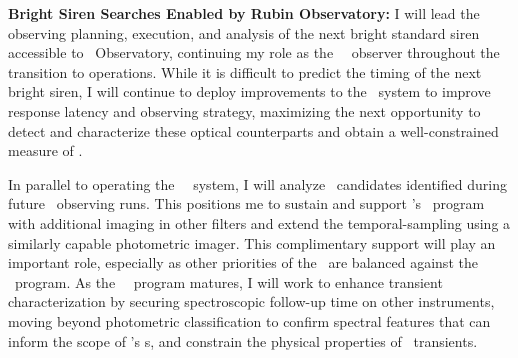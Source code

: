 \textbf{Bright Siren Searches Enabled by Rubin Observatory:}
I will lead the observing planning, execution, and analysis of the next bright standard siren accessible to \Rubin\ Observatory, 
continuing my role as the \Rubin\ \ToO\ observer throughout the transition to operations.
While it is difficult to predict the timing of the next bright siren, I will continue to deploy improvements to the \ToO\ system to improve response latency and observing strategy, maximizing the next opportunity to detect and characterize these 
optical counterparts and obtain a well-constrained measure of \Ho.

In parallel to operating the \Rubin\ \ToO\ system, I will analyze \DESGW\ candidates identified during future \LVK\ observing runs. This positions me to sustain and support \Rubin's \ToO\ program with additional imaging in other filters and extend the temporal-sampling using a similarly capable photometric imager. This complimentary support will play an important role, especially as other priorities of the \LSST\ are balanced against the \ToO\ program.
As the \LSST\ \ToO\ program matures, I will work to enhance transient characterization by securing spectroscopic follow-up time on other instruments, moving beyond photometric classification to confirm spectral features that can inform the scope of \Rubin's \ToO s, and constrain the physical properties of \LSST\ transients.%


